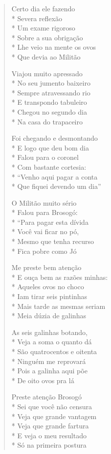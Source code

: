 \begin{verse}
Certo dia ele fazendo\\*
Severa reflexão\\*
Um exame rigoroso\\*
Sobre a sua obrigação\\*
Lhe veio na mente os ovos\\*
Que devia ao Militão

Viajou muito apressado\\*
No seu jumento baixeiro\\*
Sempre atravessando rio\\*
E transpondo tabuleiro\\*
Chegou no segundo dia\\*
Na casa do trapaceiro

Foi chegando e desmontando\\*
E logo que deu bom dia\\*
Falou para o coronel\\*
Com bastante cortesia:\\*
``Venho aqui pagar a conta\\*
Que fiquei devendo um dia''

O Militão muito sério\\*
Falou para Brosogó:\\*
``Para pagar esta dívida\\*
Você vai ficar no pó,\\*
Mesmo que tenha recurso\\*
Fica pobre como Jó

Me preste bem atenção\\*
E ouça bem as razões minhas:\\*
Aqueles ovos no choco\\*
Iam tirar seis pintinhas\\*
Mais tarde as mesmas seriam\\*
Meia dúzia de galinhas

As seis galinhas botando,\\*
Veja a soma o quanto dá\\*
São quatrocentos e oitenta\\*
Ninguém me reprovará\\*
Pois a galinha aqui põe\\*
De oito ovos pra lá

Preste atenção Brosogó\\*
Sei que você não censura\\*
Veja que grande vantagem\\*
Veja que grande fartura\\*
E veja o meu resultado\\*
Só na primeira postura


\end{verse}
